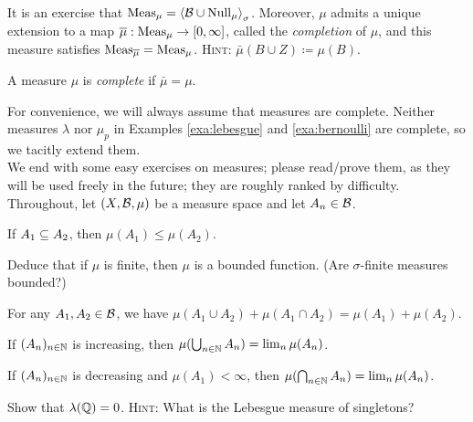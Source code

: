 \documentclass[reqno, twoside]{article}
\begin{document}
    It is an exercise that $\operatorname{Meas}_\mu=\left\langle\mathcal{B}\cup\operatorname{Null}_\mu\right\rangle_\sigma$. Moreover, $\mu$ admits a unique extension to a map $\overline{\mu}:\operatorname{Meas}_\mu\to[0,\infty]$, called the \textit{completion} of $\mu$, and this measure satisfies $\operatorname{Meas}_{\overline{\mu}}=\operatorname{Meas}_\mu$. \textsc{Hint}: $\bar{\mu}(B\cup Z)\coloneqq\mu(B)$.

    \begin{definition}
        A measure $\mu$ is \textit{complete} if $\bar{\mu}=\mu$.
    \end{definition}

    For convenience, we will always assume that measures are complete. Neither measures $\lambda$ nor $\mu_p$ in Examples \ref{exa:lebesgue} and \ref{exa:bernoulli} are complete, so we tacitly extend them. \\

    We end with some easy exercises on measures; please read/prove them, as they will be used freely in the future; they are roughly ranked by difficulty. Throughout, let $(X,\mathcal{B},\mu)$ be a measure space and let $A_n\in\mathcal{B}$.

    \begin{exercise}[Monotonicity]
        If $A_1\subseteq A_2$, then $\mu(A_1)\leq\mu(A_2)$.
    \end{exercise}

    Deduce that if $\mu$ is finite, then $\mu$ is a bounded function. (Are $\sigma$-finite measures bounded?)

    \begin{exercise}
        For any $A_1,A_2\in\mathcal{B}$, we have $\mu(A_1\cup A_2)+\mu(A_1\cap A_2)=\mu(A_1)+\mu(A_2)$.
    \end{exercise}

    \begin{exercise}
        If $(A_n)_{n\in\mathbb{N}}$ is increasing, then $\mu(\bigcup_{n\in\mathbb{N}}A_n)=\lim_n\mu(A_n)$.
    \end{exercise}

    \begin{exercise}
        If $(A_n)_{n\in\mathbb{N}}$ is decreasing and $\mu(A_1)<\infty$, then $\mu(\bigcap_{n\in\mathbb{N}}A_n)=\lim_n\mu(A_n)$.
    \end{exercise}

    \begin{exercise}
        Show that $\lambda(\mathbb{Q})=0$. \textsc{Hint:} What is the Lebesgue measure of singletons?
    \end{exercise}
\end{document}
